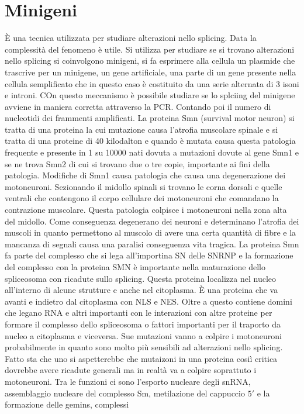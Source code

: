 \section{Minigeni}
\`E una tecnica utilizzata per studiare alterazioni nello splicing. Data la complessit\`a del fenomeno \`e utile. Si utilizza per studiare se si trovano alterazioni nello splicing si 
coinvolgono minigeni, si fa esprimere alla cellula un plasmide che trascrive per un minigene, un gene artificiale, una parte di un gene presente nella cellula semplificato che in questo
caso \`e costituito da una serie alternata di 3 isoni e introni. COn questo meccanismo \`e possibile studiare se lo splciing del minigene avviene in maniera corretta attraverso la PCR. 
Contando poi il numero di nucleotidi dei frammenti amplificati. La proteina Smn (survival motor neuron) si tratta di una proteina la cui mutazione causa l'atrofia muscolare spinale e
si tratta di una proteine di 40 kilodalton e quando \`e mutata causa questa patologia frequente e presente in 1 su 10000 nati dovuta a mutazioni dovute al gene Smn1 e se ne trova Smn2
di cui si trovano due o tre copie, importante ai fini della patologia. Modifiche di Smn1 causa patologia che causa una degenerazione dei motoneuroni. Sezionando il midollo spinali si 
trovano le corna dorsali e quelle ventrali che contengono il corpo cellulare dei motoneuroni che comandano la contrazione muscolare. Questa patologia colpisce i motoneuroni nella zona
alta del midollo. Come conseguenza degenerano dei neuroni e determinano l'atrofia dei muscoli in quanto permettono al muscolo di avere una certa quantit\`a di fibre e la mancanza di 
segnali causa una paralisi conseguenza vita tragica. La proteina Smn fa parte del complesso che si lega all'importina SN delle SNRNP e la formazione del complesso con la proteina SMN \`e
importante nella maturazione dello spliceosoma con ricadute sullo splicing. Questa proteina localizza nel nucleo all'interno di alcune strutture e anche nel citoplasma. \`E una proteina
che va avanti e indietro dal citoplasma con NLS e NES. Oltre a questo contiene domini che legano RNA e altri importanti con le interazioni con altre proteine per formare il complesso 
dello spliceosoma o fattori importanti per il traporto da nucleo a citoplasma e viceversa. Sue mutazioni vanno a colpire i motoneuroni probabilmente in quanto sono molto pi\`u sensibili
ad alterazioni nello splicing. Fatto sta che uno si aspetterebbe che mutaizoni in una proteina cosi\`i critica dovrebbe avere ricadute generali ma in realt\`a va a colpire soprattuto i 
motoneuroni. Tra le funzioni ci sono l'esporto nucleare degli snRNA, assemblaggio nucleare del complesso Sm, metilazione del cappuccio $5'$ e la formazione delle gemins, complessi 
